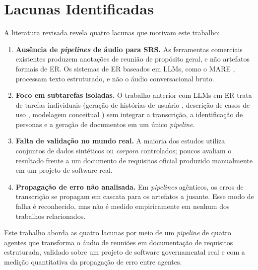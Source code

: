 \section{Lacunas Identificadas}

A literatura revisada revela quatro lacunas que motivam este trabalho:

\begin{enumerate}
    \item[1.] \textbf{Ausência de \textit{pipelines} de áudio para SRS.} As ferramentas comerciais existentes \cite{fellow2025,jamie2025} produzem anotações de reunião de propósito geral, e não artefatos formais de ER. Os sistemas de ER baseados em LLMs, como o MARE \cite{jin2024mare}, processam texto estruturado, e não o áudio conversacional bruto.

    \item[2.] \textbf{Foco em subtarefas isoladas.} O trabalho anterior com LLMs em ER trata de tarefas individuais (geração de histórias de usuário \cite{delgado2024aidriven}, descrição de casos de uso \cite{naimi2024automating}, modelagem conceitual \cite{ren2024combining}) sem integrar a transcrição, a identificação de personas e a geração de documentos em um único \textit{pipeline}.

    \item[3.] \textbf{Falta de validação no mundo real.} A maioria dos estudos utiliza conjuntos de dados sintéticos ou \textit{corpora} controlados; poucos avaliam o resultado frente a um documento de requisitos oficial produzido manualmente em um projeto de software real.

    \item[4.] \textbf{Propagação de erro não analisada.} Em \textit{pipelines} agênticos, os erros de transcrição se propagam em cascata para os artefatos a jusante. Esse modo de falha é reconhecido, mas não é medido empiricamente em nenhum dos trabalhos relacionados.
\end{enumerate}

Este trabalho aborda as quatro lacunas por meio de um \textit{pipeline} de quatro agentes que transforma o áudio de reuniões em documentação de requisitos estruturada, validado sobre um projeto de software governamental real e com a medição quantitativa da propagação de erro entre agentes.
